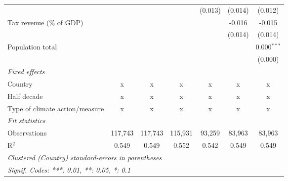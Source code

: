 \begin{tabular}{lcccccc}
                                                    &             &                &               & (0.013)        & (0.014)        & (0.012)\\   
   Tax revenue (\% of GDP)                          &             &                &               &                & -0.016         & -0.015\\   
                                                    &             &                &               &                & (0.014)        & (0.014)\\   
   Population total                                 &             &                &               &                &                & 0.000$^{***}$\\   
                                                    &             &                &               &                &                & (0.000)\\   
   \emph{Fixed effects}\\
   Country                                          & x           & x              & x             & x              & x              & x\\  
   Half decade                                      & x           & x              & x             & x              & x              & x\\  
   Type of climate action/measure                   & x           & x              & x             & x              & x              & x\\  
   \midrule \emph{Fit statistics}\\
   Observations                                     & 117,743     & 117,743        & 115,931       & 93,259         & 83,963         & 83,963\\  
   R$^2$                                            & 0.549       & 0.549          & 0.552         & 0.542          & 0.549          & 0.549\\  
   \midrule
   \multicolumn{7}{l}{\emph{Clustered (Country) standard-errors in parentheses}}\\
   \multicolumn{7}{l}{\emph{Signif. Codes: ***: 0.01, **: 0.05, *: 0.1}}\\
\end{tabular}
\par\endgroup


